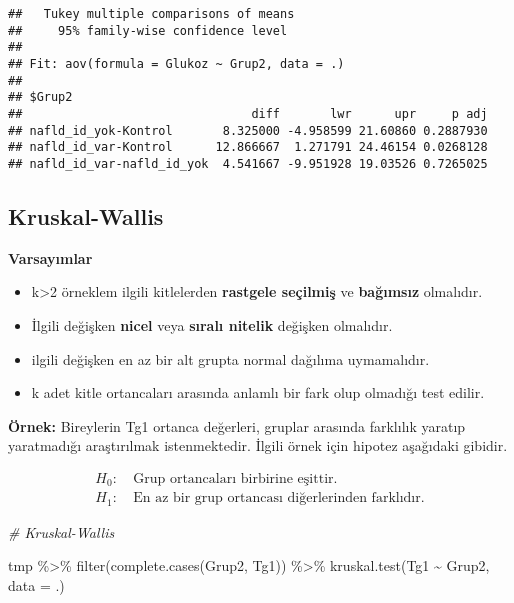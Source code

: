 \documentclass[
]{article}
\newenvironment{Shaded}{\begin{snugshade}}{\end{snugshade}}
\newcommand{\AttributeTok}[1]{\textcolor[rgb]{0.77,0.63,0.00}{#1}}
\newcommand{\CommentTok}[1]{\textcolor[rgb]{0.56,0.35,0.01}{\textit{#1}}}
\newcommand{\FunctionTok}[1]{\textcolor[rgb]{0.00,0.00,0.00}{#1}}
\newcommand{\NormalTok}[1]{#1}
\newcommand{\SpecialCharTok}[1]{\textcolor[rgb]{0.00,0.00,0.00}{#1}}
\providecommand{\tightlist}{%
  \setlength{\itemsep}{0pt}\setlength{\parskip}{0pt}}
\begin{document}
\begin{verbatim}
##   Tukey multiple comparisons of means
##     95% family-wise confidence level
## 
## Fit: aov(formula = Glukoz ~ Grup2, data = .)
## 
## $Grup2
##                                diff       lwr      upr     p adj
## nafld_id_yok-Kontrol       8.325000 -4.958599 21.60860 0.2887930
## nafld_id_var-Kontrol      12.866667  1.271791 24.46154 0.0268128
## nafld_id_var-nafld_id_yok  4.541667 -9.951928 19.03526 0.7265025
\end{verbatim}

\hypertarget{kruskal-wallis}{%
\subsection{Kruskal-Wallis}\label{kruskal-wallis}}

\textbf{Varsayımlar}

\begin{itemize}
\tightlist
\item
  k\textgreater2 örneklem ilgili kitlelerden \textbf{rastgele seçilmiş}
  ve \textbf{bağımsız} olmalıdır.
\item
  İlgili değişken \textbf{nicel} veya \textbf{sıralı nitelik} değişken
  olmalıdır.
\item
  ilgili değişken en az bir alt grupta normal dağılıma uymamalıdır.
\item
  k adet kitle ortancaları arasında anlamlı bir fark olup olmadığı test
  edilir.
\end{itemize}

\textbf{Örnek:} Bireylerin Tg1 ortanca değerleri, gruplar arasında
farklılık yaratıp yaratmadığı araştırılmak istenmektedir. İlgili örnek
için hipotez aşağıdaki gibidir.

\begin{align*}
  H_0:&~ \text{Grup ortancaları birbirine eşittir.} \\
  H_1:&~ \text{En az bir grup ortancası diğerlerinden farklıdır.}
\end{align*}

\begin{Shaded}
\begin{Highlighting}[]
\CommentTok{\# Kruskal{-}Wallis }

\NormalTok{tmp }\SpecialCharTok{\%\textgreater{}\%}
  \FunctionTok{filter}\NormalTok{(}\FunctionTok{complete.cases}\NormalTok{(Grup2, Tg1)) }\SpecialCharTok{\%\textgreater{}\%}
  \FunctionTok{kruskal.test}\NormalTok{(Tg1 }\SpecialCharTok{\textasciitilde{}}\NormalTok{ Grup2, }\AttributeTok{data =}\NormalTok{ .)}
\end{Highlighting}
\end{Shaded}
\end{document}
